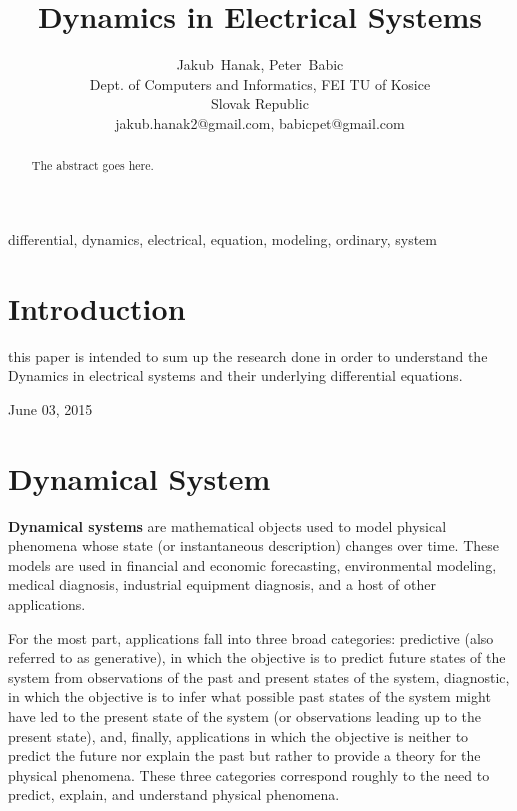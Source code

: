 \documentclass[journal]{IEEEtran}
\begin{document}
\boldmath

\title{Dynamics in Electrical Systems}

\author{Jakub~Hanak,
        Peter~Babic\\%
        Dept. of Computers and Informatics, FEI TU of Kosice\\%
        Slovak Republic\\%
        jakub.hanak2@gmail.com, babicpet@gmail.com%
}

%
{}


\maketitle


\begin{abstract}
The abstract goes here.
\end{abstract}

\begin{IEEEkeywords}
differential, dynamics, electrical, equation, modeling, ordinary, system
\end{IEEEkeywords}



\IEEEpeerreviewmaketitle



\section{Introduction}

 this paper is intended to sum up the research done in order to understand the Dynamics in electrical systems and their underlying differential equations.

 
\hfill June 03, 2015

\section{Dynamical System}
\textbf{Dynamical systems} are mathematical objects used to model physical phenomena whose state (or instantaneous description) changes over time. These models are used in financial and economic forecasting, environmental modeling, medical diagnosis, industrial equipment diagnosis, and a host of other applications.

For the most part, applications fall into three broad categories: predictive (also referred to as generative), in which the objective is to predict future states of the system from observations of the past and present states of the system, diagnostic, in which the objective is to infer what possible past states of the system might have led to the present state of the system (or observations leading up to the present state), and, finally, applications in which the objective is neither to predict the future nor explain the past but rather to provide a theory for the physical phenomena. These three categories correspond roughly to the need to predict, explain, and understand physical phenomena.
\end{document}
